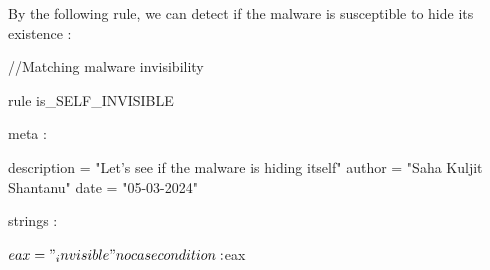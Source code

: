 By the following rule, we can detect if the malware is susceptible to hide its existence : \\

\begin{yaracode}

//Matching malware invisibility

rule is_SELF_INVISIBLE {

    meta : 

        description = "Let's see if the malware is hiding itself"
        author = "Saha Kuljit Shantanu"
        date = "05-03-2024"

    strings :

        $eax = "_invisible" nocase

    condition:

        $eax


}


\end{yaracode}
